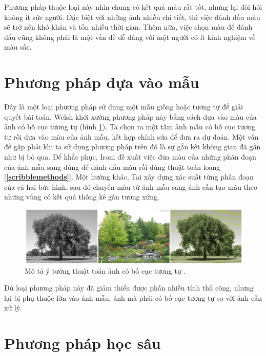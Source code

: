 \documentclass[a4paper, 12pt]{report}
\begin{document}
Phương pháp thuộc loại này nhìn chung có kết quả màu rất tốt, nhưng lại đòi hỏi không ít sức người.
Đặc biệt với những ảnh nhiều chi tiết, thì việc đánh dấu màu sẽ trở nên khó khăn và tốn nhiều thời gian.
Thêm nữa, việc chọn màu để đánh dấu cũng không phải là một vấn đề dễ dàng với một người có ít kinh nghiệm về màu sắc.

\section{Phương pháp dựa vào mẫu}\label{examplarmethods}

Đây là một loại phương pháp sử dụng một mẫu giống hoặc tương tự để giải quyết bài toán.
Welsh \cite{welshcolorization} khởi xướng phương pháp này bằng cách dựa vào màu của ảnh có bố cục tương tự (hình \ref{fig:examplarmethod}).
Ta chọn ra một tấm ảnh mẫu có bố cục tương tự rồi dựa vào màu của ảnh mẫu, kết hợp chỉnh sửa để đưa ra dự đoán.
Một vấn đề gặp phải khi ta sử dụng phương pháp trên đó là sự gắn kết không gian đã gần như bị bỏ qua.
Để khắc phục, Ironi \cite{ironicolorization} đề xuất việc đưa màu của những phân đoạn của ảnh mẫu sang dùng để đánh dấu màu rồi dùng thuật toán loang [\textbf{\ref{scribblemethods}}].
Một hướng khác, Tai \cite{taicolorization} xây dựng xác suất từng phân đoạn của cả hai bức hình, sau đó chuyển màu từ ảnh mẫu sang ảnh cần tạo màu theo những vùng có kết quả thống kê gần tương xứng.

\begin{figure}[!h]
\captionsetup{width=0.8\textwidth}
\centering
\includegraphics[width=15cm]{images/2_5.png}
\caption{Mô tả ý tưởng thuật toán ảnh có bố cục tương tự \cite{trungcolorization2018}.}
\label{fig:examplarmethod}
\end{figure}


Dù loại phương pháp này đã giảm thiểu được phần nhiều tính thủ công, nhưng lại bị phụ thuộc lớn vào ảnh mẫu, ảnh mà phải có bố cục tương tự so với ảnh cần xử lý.

\section{Phương pháp học sâu}\label{deeplearningmethods}
\end{document}
